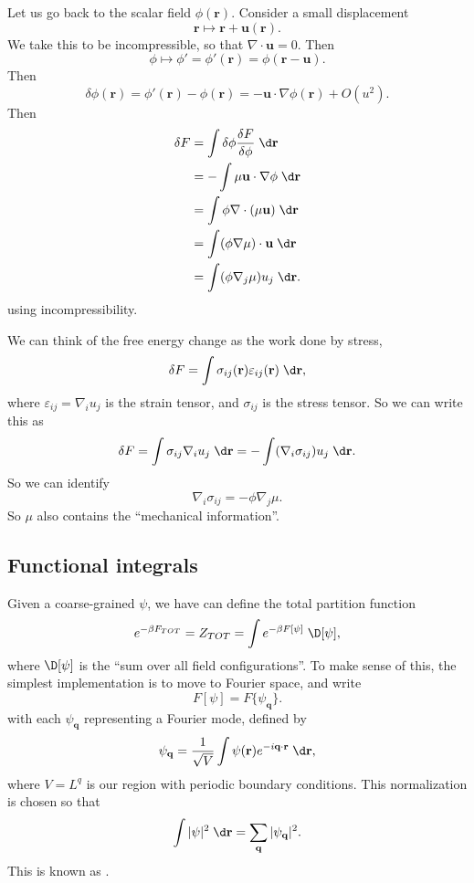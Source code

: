 \documentclass[a4paper]{article}
\begin{document}
Let us go back to the scalar field $\phi(\mathbf{r})$. Consider a small displacement
\[
  \mathbf{r} \mapsto \mathbf{r} + \mathbf{u}(\mathbf{r}).
\]
We take this to be incompressible, so that $\nabla \cdot \mathbf{u} = 0$. Then
\[
  \phi \mapsto \phi' = \phi'(\mathbf{r}) = \phi(\mathbf{r} - \mathbf{u}).
\]
Then
\[
  \delta \phi(\mathbf{r}) = \phi'(\mathbf{r}) - \phi(\mathbf{r}) = - \mathbf{u} \cdot \nabla \phi(\mathbf{r}) + O(u^2).
\]
Then
\begin{align*}
  \delta F &= \int \delta \phi \frac{\delta F}{\delta \phi}\;\d \mathbf{r} \\
  &= -\int \mu \mathbf{u} \cdot \nabla \phi \;\d \mathbf{r}\\
  &= \int \phi \nabla \cdot (\mu \mathbf{u})\;\d \mathbf{r}\\
  &= \int (\phi \nabla \mu)\cdot \mathbf{u}\;\d \mathbf{r}\\
  &= \int (\phi \nabla_j \mu)u_j\;\d \mathbf{r}.
\end{align*}
using incompressibility.

We can think of the free energy change as the work done by stress,
\[
  \delta F = \int \sigma_{ij}(\mathbf{r}) \varepsilon_{ij}(\mathbf{r})\;\d \mathbf{r},
\]
where $\varepsilon_{ij} = \nabla_i u_j$ is the strain tensor, and $\sigma_{ij}$ is the stress tensor. So we can write this as
\[
  \delta F = \int \sigma_{ij} \nabla_i u_j\;\d \mathbf{r} = - \int (\nabla_i \sigma_{ij}) u_j\;\d \mathbf{r}.
\]
So we can identify
\[
  \nabla_i \sigma_{ij} = -\phi \nabla_j \mu.
\]
So $\mu$ also contains the ``mechanical information''.

\subsection{Functional integrals}
Given a coarse-grained $\psi$, we have can define the total partition function
\[
  e^{-\beta F_{TOT}} = Z_{TOT} = \int e^{-\beta F[\psi]} \;\D [\psi],
\]
where $\D [\psi]$ is the ``sum over all field configurations''. To make sense of this, the simplest implementation is to move to Fourier space, and write
\[
  F[\psi] = F\{\psi_\mathbf{q}\}.
\]
with each $\psi_\mathbf{q}$ representing a Fourier mode, defined by
\[
  \psi_\mathbf{q} = \frac{1}{\sqrt{V}} \int \psi(\mathbf{r}) e^{-i\mathbf{q}\cdot \mathbf{r}}\;\d \mathbf{r},
\]
where $V = L^q$ is our region with periodic boundary conditions. This normalization is chosen so that
\[
  \int |\psi|^2 \;\d \mathbf{r} = \sum_{\mathbf{q} } |\psi_\mathbf{q}|^2.
\]
This is known as .
\end{document}
